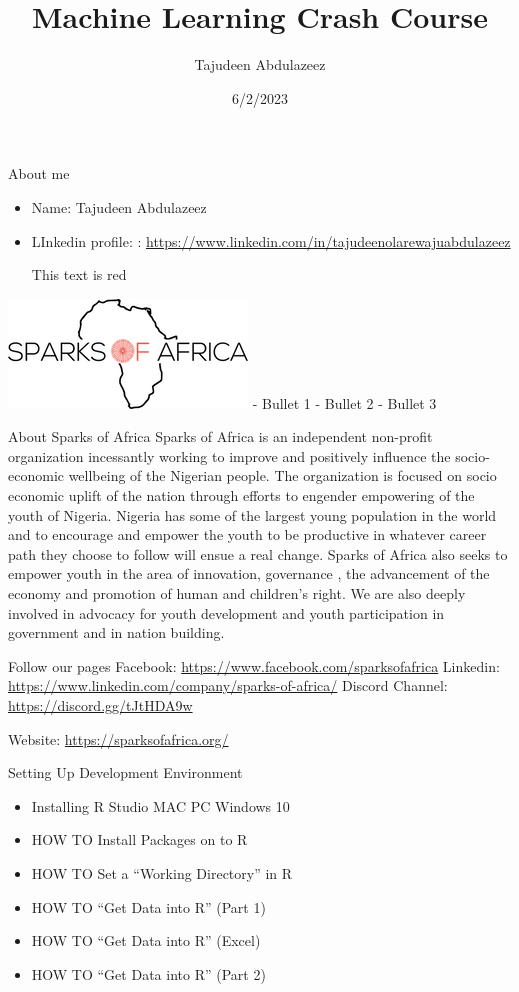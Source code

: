 \documentclass[
  ignorenonframetext,
]{beamer}
\title{Machine Learning Crash Course}
\author{Tajudeen Abdulazeez}
\date{6/2/2023}
\providecommand{\tightlist}{%
  \setlength{\itemsep}{0pt}\setlength{\parskip}{0pt}}
\begin{document}
\frame{\titlepage}

\begin{frame}{About me}
\protect\hypertarget{about-me}{}
\begin{itemize}
\tightlist
\item
  Name: Tajudeen Abdulazeez
\item
  LInkedin profile: :
  \url{https://www.linkedin.com/in/tajudeenolarewajuabdulazeez}

  This text is red
\end{itemize}

\includegraphics{logo-2.png} - Bullet 1 - Bullet 2 - Bullet 3
\end{frame}

\begin{frame}{About Sparks of Africa}
\protect\hypertarget{about-sparks-of-africa}{}
Sparks of Africa is an independent non-profit organization incessantly
working to improve and positively influence the socio-economic wellbeing
of the Nigerian people. The organization is focused on socio economic
uplift of the nation through efforts to engender empowering of the youth
of Nigeria. Nigeria has some of the largest young population in the
world and to encourage and empower the youth to be productive in
whatever career path they choose to follow will ensue a real change.
Sparks of Africa also seeks to empower youth in the area of innovation,
governance , the advancement of the economy and promotion of human and
children's right. We are also deeply involved in advocacy for youth
development and youth participation in government and in nation
building.
\end{frame}

\begin{frame}{Follow our pages}
\protect\hypertarget{follow-our-pages}{}
Facebook: \url{https://www.facebook.com/sparksofafrica} Linkedin:
\url{https://www.linkedin.com/company/sparks-of-africa/} Discord
Channel: \url{https://discord.gg/tJtHDA9w}

Website: \url{https://sparksofafrica.org/}
\end{frame}

\begin{frame}{Setting Up Development Environment}
\protect\hypertarget{setting-up-development-environment}{}
\begin{itemize}
\item
  Installing R Studio MAC PC Windows 10
\item
  HOW TO Install Packages on to R
\item
  HOW TO Set a ``Working Directory'' in R
\item
  HOW TO ``Get Data into R'' (Part 1)
\item
  HOW TO ``Get Data into R'' (Excel)
\item
  HOW TO ``Get Data into R'' (Part 2)
\end{itemize}
\end{frame}
\end{document}
